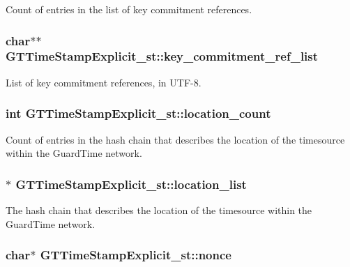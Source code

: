 \label{struct_g_t_time_stamp_explicit__st_a524b118c600484b08ab9cf92f0ea3130}
Count of entries in the list of key commitment references. \hypertarget{struct_g_t_time_stamp_explicit__st_a5a275a4d0863f94b657206d3ba148793}{
\subsubsection[{key\_\-commitment\_\-ref\_\-list}]{\setlength{\rightskip}{0pt plus 5cm}char$\ast$$\ast$ {\bf GTTimeStampExplicit\_\-st::key\_\-commitment\_\-ref\_\-list}}}
\label{struct_g_t_time_stamp_explicit__st_a5a275a4d0863f94b657206d3ba148793}
List of key commitment references, in UTF-\/8. \hypertarget{struct_g_t_time_stamp_explicit__st_ae9f5e750ed9cd31ec89177f72eb4d84e}{
\subsubsection[{location\_\-count}]{\setlength{\rightskip}{0pt plus 5cm}int {\bf GTTimeStampExplicit\_\-st::location\_\-count}}}
\label{struct_g_t_time_stamp_explicit__st_ae9f5e750ed9cd31ec89177f72eb4d84e}
Count of entries in the hash chain that describes the location of the timesource within the GuardTime network. \hypertarget{struct_g_t_time_stamp_explicit__st_a668518840475a7feec8f0391bcc26cad}{
\subsubsection[{location\_\-list}]{$\ast$ {\bf GTTimeStampExplicit\_\-st::location\_\-list}}}
\label{struct_g_t_time_stamp_explicit__st_a668518840475a7feec8f0391bcc26cad}
The hash chain that describes the location of the timesource within the GuardTime network. \hypertarget{struct_g_t_time_stamp_explicit__st_a135e613097d30c78572a836d486268be}{
\subsubsection[{nonce}]{\setlength{\rightskip}{0pt plus 5cm}char$\ast$ {\bf GTTimeStampExplicit\_\-st::nonce}}}
